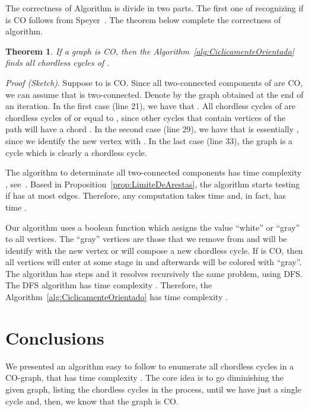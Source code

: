 \documentclass{lawcg}
\newtheorem{theorem}{Theorem}
\newenvironment{proof}{\par \noindent \textit{Proof (Sketch)}.}{\hfill \newline}
\begin{document}
The correctness of Algorithm  is divide in two parts. The first one of recognizing if  is CO follows from Speyer~\cite{S2005}. The theorem below complete the correctness of algorithm.

\begin{theorem} \label{teo:CO_CC}
If a graph  is CO, then the Algorithm~\ref{alg:CiclicamenteOrientado} finds all chordless cycles of .
\end{theorem}

\begin{proof}
Suppose to  is CO. Since all two-connected components  of  are CO, we can assume that  is two-connected. Denote by  the graph obtained at the end of an iteration. In the first case (line 21), we have that . All chordless cycles of  are chordless cycles of  or equal to , since other cycles that contain vertices of the path  will have a chord . In the second case (line 29), we have that  is essentially , since we identify the new vertex  with . In the last case (line 33), the graph  is a cycle which is clearly a chordless cycle.
\end{proof}



The algorithm to determinate all two-connected components has time complexity , see~\cite{S1988}. Based in Proposition~\ref{prop:LimiteDeArestas}, the algorithm starts testing if  has at most  edges. Therefore, any computation takes time  and, in fact, has time . 

Our algorithm uses a boolean function  which assigns the value ``white'' or ``gray'' to all vertices. The ``gray'' vertices are those that we remove from  and will be identify with the new vertex  or will compose a new chordless cycle. If  is CO, then all vertices will enter at some stage in  and afterwards will be colored with ``gray''. The algorithm has  steps and it resolves recursively the same problem, using DFS. The DFS algorithm has time complexity . Therefore, the Algorithm~\ref{alg:CiclicamenteOrientado} has time complexity . 


\section{Conclusions}
\label{sec:Conclusions}

We presented an algorithm easy to follow to enumerate all chordless cycles in a CO-graph, that has time complexity . The core idea is to go diminishing the given graph, listing the chordless cycles in the process, until we have just a single cycle and, then, we know that the graph is CO.
\end{document}
